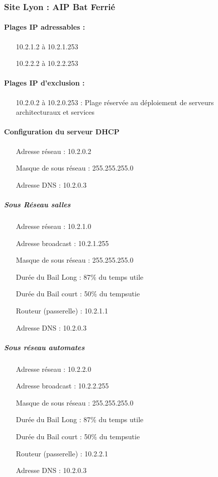 \documentclass[a4paper]{article}
\begin{document}
\subsubsection{Site Lyon : AIP Bat Ferrié}

\paragraph{Plages IP adressables :} 
\begin{itemize}
\item[10.2.1.2 à 10.2.1.253]
\item[10.2.2.2 à 10.2.2.253]
\end{itemize}

\paragraph{Plages IP d'exclusion :}
\begin{itemize}
\item[10.2.0.2 à 10.2.0.253] : Plage réservée au déploiement de serveurs architecturaux et services
\end{itemize}

\paragraph{Configuration du serveur DHCP}

\begin{itemize}
\item[Adresse réseau]: 10.2.0.2
\item[Masque de sous réseau]: 255.255.255.0
\item[Adresse DNS]: 10.2.0.3
\end{itemize}

\subparagraph{Sous Réseau salles}
\begin{itemize}
\item[Adresse réseau]: 10.2.1.0
\item[Adresse broadcast]: 10.2.1.255
\item[Masque de sous réseau]: 255.255.255.0
\item[Durée du Bail Long]: 87\% du temps utile
\item[Durée du Bail court]: 50\% du tempsutie
\item[Routeur (passerelle)]: 10.2.1.1
\item[Adresse DNS]: 10.2.0.3
\end{itemize}

\subparagraph{Sous réseau automates}
\begin{itemize}
\item[Adresse réseau]: 10.2.2.0
\item[Adresse broadcast]: 10.2.2.255
\item[Masque de sous réseau]: 255.255.255.0
\item[Durée du Bail Long]: 87\% du temps utile
\item[Durée du Bail court]: 50\% du tempsutie
\item[Routeur (passerelle)]: 10.2.2.1
\item[Adresse DNS]: 10.2.0.3
\end{itemize}
\end{document}
